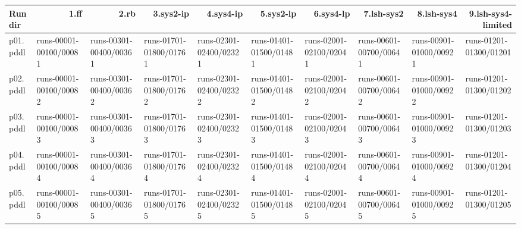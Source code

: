 \documentclass{article}
\begin{document}
\begin{tabular}{@{}lrrrrrrrrr@{}}
Run dir & 1.ff & 2.rb & 3.sys2-ip & 4.sys4-ip & 5.sys2-lp & 6.sys4-lp & 7.lsh-sys2 & 8.lsh-sys4 & 9.lsh-sys4-limited \\
\midrule
p01.pddl & \multicolumn{1}{|l|}{runs-00001-00100/00081} & \multicolumn{1}{|l|}{runs-00301-00400/00361} & \multicolumn{1}{|l|}{runs-01701-01800/01761} & \multicolumn{1}{|l|}{runs-02301-02400/02321} & \multicolumn{1}{|l|}{runs-01401-01500/01481} & \multicolumn{1}{|l|}{runs-02001-02100/02041} & \multicolumn{1}{|l|}{runs-00601-00700/00641} & \multicolumn{1}{|l|}{runs-00901-01000/00921} & \multicolumn{1}{|l|}{runs-01201-01300/01201} \\
p02.pddl & \multicolumn{1}{|l|}{runs-00001-00100/00082} & \multicolumn{1}{|l|}{runs-00301-00400/00362} & \multicolumn{1}{|l|}{runs-01701-01800/01762} & \multicolumn{1}{|l|}{runs-02301-02400/02322} & \multicolumn{1}{|l|}{runs-01401-01500/01482} & \multicolumn{1}{|l|}{runs-02001-02100/02042} & \multicolumn{1}{|l|}{runs-00601-00700/00642} & \multicolumn{1}{|l|}{runs-00901-01000/00922} & \multicolumn{1}{|l|}{runs-01201-01300/01202} \\
p03.pddl & \multicolumn{1}{|l|}{runs-00001-00100/00083} & \multicolumn{1}{|l|}{runs-00301-00400/00363} & \multicolumn{1}{|l|}{runs-01701-01800/01763} & \multicolumn{1}{|l|}{runs-02301-02400/02323} & \multicolumn{1}{|l|}{runs-01401-01500/01483} & \multicolumn{1}{|l|}{runs-02001-02100/02043} & \multicolumn{1}{|l|}{runs-00601-00700/00643} & \multicolumn{1}{|l|}{runs-00901-01000/00923} & \multicolumn{1}{|l|}{runs-01201-01300/01203} \\
p04.pddl & \multicolumn{1}{|l|}{runs-00001-00100/00084} & \multicolumn{1}{|l|}{runs-00301-00400/00364} & \multicolumn{1}{|l|}{runs-01701-01800/01764} & \multicolumn{1}{|l|}{runs-02301-02400/02324} & \multicolumn{1}{|l|}{runs-01401-01500/01484} & \multicolumn{1}{|l|}{runs-02001-02100/02044} & \multicolumn{1}{|l|}{runs-00601-00700/00644} & \multicolumn{1}{|l|}{runs-00901-01000/00924} & \multicolumn{1}{|l|}{runs-01201-01300/01204} \\
p05.pddl & \multicolumn{1}{|l|}{runs-00001-00100/00085} & \multicolumn{1}{|l|}{runs-00301-00400/00365} & \multicolumn{1}{|l|}{runs-01701-01800/01765} & \multicolumn{1}{|l|}{runs-02301-02400/02325} & \multicolumn{1}{|l|}{runs-01401-01500/01485} & \multicolumn{1}{|l|}{runs-02001-02100/02045} & \multicolumn{1}{|l|}{runs-00601-00700/00645} & \multicolumn{1}{|l|}{runs-00901-01000/00925} & \multicolumn{1}{|l|}{runs-01201-01300/01205} \\

\end{tabular}
\end{document}
